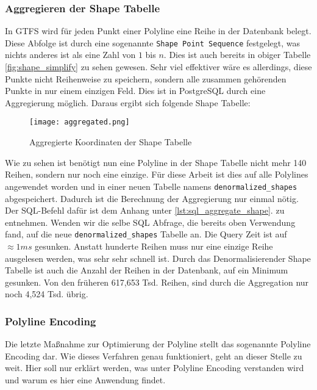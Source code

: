 
    \subsubsection*{Aggregieren der Shape Tabelle}
    \label{ssub:aggregieren_der_shape_tabelle}
      In GTFS wird für jeden Punkt einer Polyline eine Reihe in der Datenbank belegt. Diese Abfolge ist durch eine sogenannte \texttt{Shape Point Sequence} festgelegt, was nichts anderes ist als eine Zahl von $1$ bis $n$. Dies ist auch bereits in obiger Tabelle \ref{fig:shape_simplify} zu sehen gewesen. Sehr viel effektiver wäre es allerdings, diese Punkte nicht Reihenweise zu speichern, sondern alle zusammen gehörenden Punkte in nur einem einzigen Feld. Dies ist in PostgreSQL durch eine Aggregierung möglich. Daraus ergibt sich folgende Shape Tabelle:

      \begin{figure}[htbp]
        \begin{center}
          \texttt{[image: aggregated.png]}
          \caption{Aggregierte Koordinaten der Shape Tabelle}
          \label{fig:aggregated}
        \end{center}
      \end{figure}

      Wie zu sehen ist benötigt nun eine Polyline in der Shape Tabelle nicht mehr 140 Reihen, sondern nur noch eine einzige. Für diese Arbeit ist dies auf alle Polylines angewendet worden und in einer neuen Tabelle namens \texttt{denormalized\_shapes} abgespeichert. Dadurch ist die Berechnung der Aggregierung nur einmal nötig. Der SQL-Befehl dafür ist dem Anhang unter \ref{lst:sql_aggregate_shape}. zu entnehmen.
      Wenden wir die selbe SQL Abfrage, die bereits oben Verwendung fand, auf die neue \texttt{denormalized\_shapes} Tabelle an. Die Query Zeit ist auf $\approx1ms$ gesunken. Anstatt hunderte Reihen muss nur eine einzige Reihe ausgelesen werden, was sehr sehr schnell ist. Durch das Denormalisieren\footnotemark der Shape Tabelle ist auch die Anzahl der Reihen in der Datenbank, auf ein Minimum gesunken. Von den früheren 617,653 Tsd. Reihen, sind durch die Aggregation nur noch 4,524 Tsd. übrig.

    

    \subsubsection*{Polyline Encoding}
    \label{ssub:polyline_encoding}
      Die letzte Maßnahme zur Optimierung der Polyline stellt das sogenannte Polyline Encoding dar. Wie dieses Verfahren genau funktioniert, geht an dieser Stelle zu weit. Hier soll nur erklärt werden, was unter Polyline Encoding verstanden wird und warum es hier eine Anwendung findet.\\


